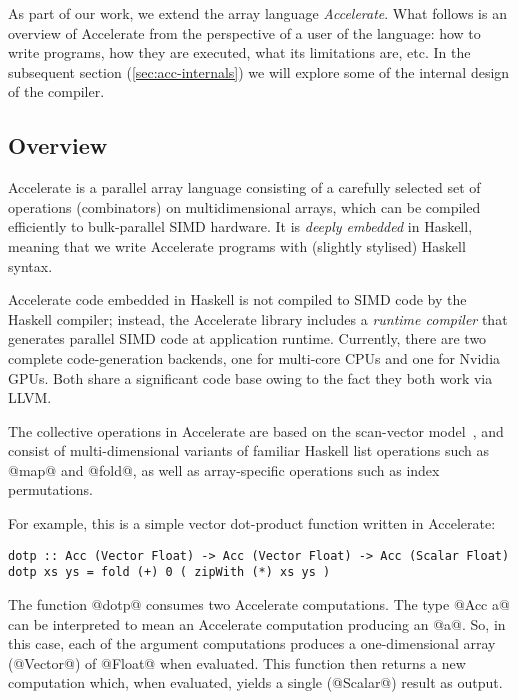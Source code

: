 As part of our work, we extend the array language \emph{Accelerate}. What follows is an overview of Accelerate from the perspective of a user of the language: how to write programs, how they are executed, what its limitations are, etc. In the subsequent section (\ref{sec:acc-internals}) we will explore some of the internal design of the compiler.

\subsection{Overview}
\label{sec:acc-intro}


Accelerate is a parallel array language consisting of a carefully selected set of operations (combinators) on multidimensional arrays, which can be compiled efficiently to bulk-parallel SIMD hardware. It is \emph{deeply embedded} in Haskell, meaning that we write Accelerate programs with (slightly stylised) Haskell syntax.

Accelerate code embedded in Haskell is not compiled to SIMD code by the Haskell compiler; instead, the Accelerate library includes a \emph{runtime compiler} that generates parallel SIMD code at application runtime. Currently, there are two complete code-generation backends, one for multi-core CPUs and one for Nvidia GPUs. Both share a significant code base owing to the fact they both work via LLVM.

The collective operations in Accelerate are based on the scan-vector model~\citep{Chatterjee:1990vj,Sengupta:2007tc}, and consist of multi-dimensional variants of familiar Haskell list operations such as @map@ and @fold@, as well as array-specific operations such as index permutations.

For example, this is a simple vector dot-product function written in Accelerate:
%
\begin{lstlisting}
dotp :: Acc (Vector Float) -> Acc (Vector Float) -> Acc (Scalar Float)
dotp xs ys = fold (+) 0 ( zipWith (*) xs ys )
\end{lstlisting}
%
The function @dotp@ consumes two Accelerate computations. The type @Acc a@ can be interpreted to mean an Accelerate computation producing an @a@. So, in this case, each of the argument computations produces a one-dimensional array (@Vector@) of @Float@ when evaluated. This function then returns a new computation which, when evaluated, yields a single (@Scalar@) result as output.

